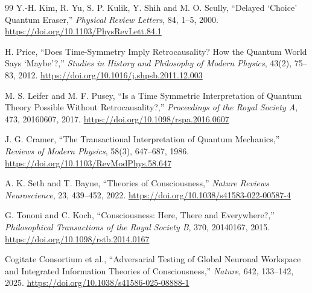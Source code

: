 \documentclass[11pt,a4paper]{article}
\theoremstyle{remark}
\begin{document}
\begin{thebibliography}{99}
Y.-H. Kim, R. Yu, S. P. Kulik, Y. Shih and M. O. Scully,
``Delayed `Choice' Quantum Eraser,''
\emph{Physical Review Letters}, 84, 1--5, 2000.
\url{https://doi.org/10.1103/PhysRevLett.84.1}

H. Price,
``Does Time-Symmetry Imply Retrocausality? How the Quantum World Says
`Maybe'?,''
\emph{Studies in History and Philosophy of Modern Physics}, 43(2), 75--83,
2012.
\url{https://doi.org/10.1016/j.shpsb.2011.12.003}

M. S. Leifer and M. F. Pusey,
``Is a Time Symmetric Interpretation of Quantum Theory Possible Without
Retrocausality?,''
\emph{Proceedings of the Royal Society A}, 473, 20160607, 2017.
\url{https://doi.org/10.1098/rspa.2016.0607}

J. G. Cramer,
``The Transactional Interpretation of Quantum Mechanics,''
\emph{Reviews of Modern Physics}, 58(3), 647--687, 1986.
\url{https://doi.org/10.1103/RevModPhys.58.647}

A. K. Seth and T. Bayne,
``Theories of Consciousness,''
\emph{Nature Reviews Neuroscience}, 23, 439--452, 2022.
\url{https://doi.org/10.1038/s41583-022-00587-4}

G. Tononi and C. Koch,
``Consciousness: Here, There and Everywhere?,''
\emph{Philosophical Transactions of the Royal Society B}, 370, 20140167,
2015.
\url{https://doi.org/10.1098/rstb.2014.0167}

Cogitate Consortium et al.,
``Adversarial Testing of Global Neuronal Workspace and Integrated Information
Theories of Consciousness,''
\emph{Nature}, 642, 133--142, 2025.
\url{https://doi.org/10.1038/s41586-025-08888-1}

\end{thebibliography}
\end{document}
